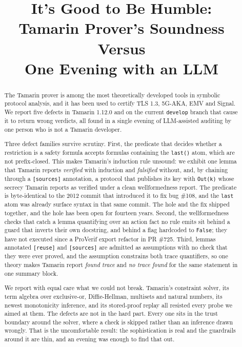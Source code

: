 \documentclass[version=preprint]{iacrcc}
\title[running   = {It's Good to Be Humble},
       plaintext = {It's Good to Be Humble: Tamarin Prover's Soundness Versus One Evening with an LLM}
      ]{It's Good to Be Humble:\\Tamarin Prover's Soundness Versus\\One Evening with an LLM}
\newcommand{\code}[1]{\texttt{\small #1}}
\newcommand{\tmc}[1]{\lstinline[style=tbase,language=TamarinL,
  backgroundcolor=\color{white},frame=none,basicstyle=\ttfamily\small]|#1|}
\theoremstyle{definition}
\theoremstyle{remark}
\begin{document}
\maketitle


\begin{abstract}
	The Tamarin prover is among the most theoretically developed tools in symbolic protocol analysis, and it has been used to certify TLS 1.3, 5G-AKA, EMV and Signal. We report five defects in Tamarin 1.12.0 and on the current \code{develop} branch that cause it to return wrong verdicts, all found in a single evening of LLM-assisted auditing by one person who is not a Tamarin developer.

	Three defect families survive scrutiny. First, the predicate that decides whether a restriction is a safety formula accepts formulas containing the \code{last()} atom, which are not prefix-closed. This makes Tamarin's induction rule unsound: we exhibit one lemma that Tamarin reports \emph{verified} with induction and \emph{falsified} without, and, by chaining through a \code{[sources]} annotation, a protocol that publishes its key with \tmc{Out(k)} whose secrecy Tamarin reports as verified under a clean wellformedness report. The predicate is byte-identical to the 2012 commit that introduced it to fix bug \#108, and the \code{last} atom was already surface syntax in that same commit. The hole and the fix shipped together, and the hole has been open for fourteen years. Second, the wellformedness checks that catch a lemma quantifying over an action fact no rule emits sit behind a guard that inverts their own docstring, and behind a flag hardcoded to \code{False}; they have not executed since a ProVerif export refactor in PR \#725. Third, lemmas annotated \code{[reuse]} and \code{[sources]} are admitted as assumptions with no check that they were ever proved, and the assumption constrains both trace quantifiers, so one theory makes Tamarin report \emph{found trace} and \emph{no trace found} for the same statement in one summary block.

	We report with equal care what we could not break. Tamarin's constraint solver, its term algebra over exclusive-or, Diffie-Hellman, multisets and natural numbers, its newest monotonicity inference, and its stored-proof replay all resisted every probe we aimed at them. The defects are not in the hard part. Every one sits in the trust boundary around the solver, where a check is skipped rather than an inference drawn wrongly. That is the uncomfortable result: the sophistication is real and the guardrails around it are thin, and an evening was enough to find that out.
\end{abstract}
\end{document}
